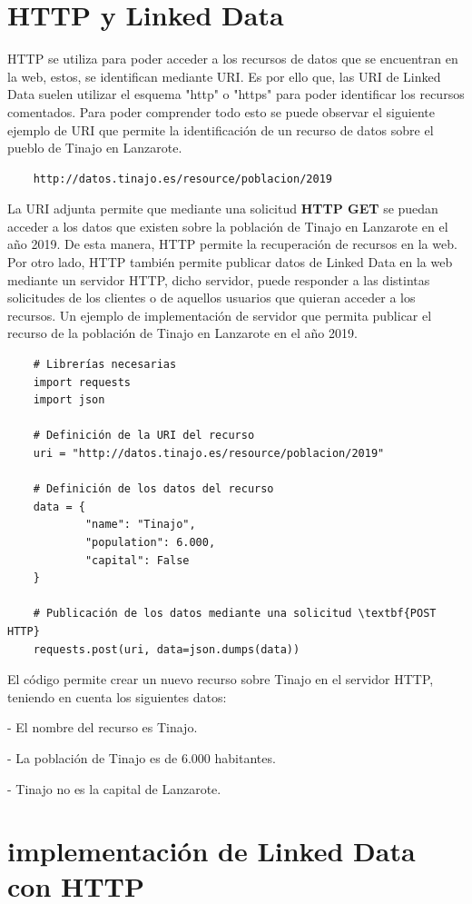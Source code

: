 \documentclass[11pt]{report}
\begin{document}
\section{HTTP y Linked Data}

HTTP se utiliza para poder acceder a los recursos de datos que se encuentran en la web, estos, se identifican mediante URI. Es por ello que, las URI de Linked Data suelen utilizar el esquema "http" o "https" para poder identificar los recursos comentados. Para poder comprender todo esto se puede observar el siguiente ejemplo de URI que permite la identificación de un recurso de datos sobre el pueblo de Tinajo en Lanzarote.

\begin{verbatim}
	http://datos.tinajo.es/resource/poblacion/2019
\end{verbatim}

La URI adjunta permite que mediante una solicitud \textbf{HTTP GET} se puedan acceder a los datos que existen sobre la población de Tinajo en Lanzarote en el año 2019. De esta manera, HTTP permite la recuperación de recursos en la web. Por otro lado, HTTP también permite publicar datos de Linked Data en la web mediante un servidor HTTP, dicho servidor, puede responder a las distintas solicitudes de los clientes o de aquellos usuarios que quieran acceder a los recursos. Un ejemplo de implementación de servidor que permita publicar el recurso de la población de Tinajo en Lanzarote en el año 2019.

\begin{verbatim}
	# Librerías necesarias
	import requests
	import json

	# Definición de la URI del recurso
	uri = "http://datos.tinajo.es/resource/poblacion/2019"

	# Definición de los datos del recurso
	data = {
			"name": "Tinajo",
			"population": 6.000,
			"capital": False
	}

	# Publicación de los datos mediante una solicitud \textbf{POST HTTP}
	requests.post(uri, data=json.dumps(data))
\end{verbatim}

El código permite crear un nuevo recurso sobre Tinajo en el servidor HTTP, teniendo en cuenta los siguientes datos:

- El nombre del recurso es Tinajo.

- La población de Tinajo es de 6.000 habitantes.

- Tinajo no es la capital de Lanzarote.

\section{implementación de Linked Data con HTTP}
\end{document}
